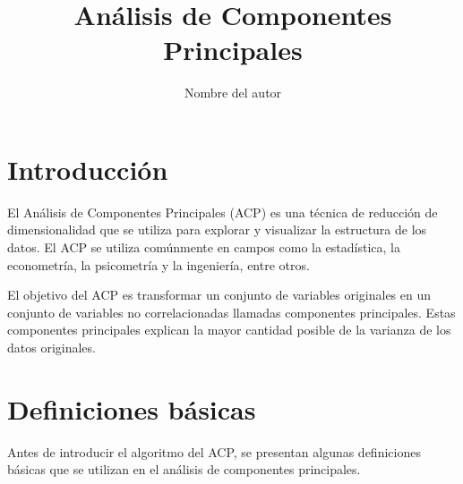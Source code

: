 \documentclass{article}
\begin{document}
\title{Análisis de Componentes Principales}
\author{Nombre del autor}
\maketitle

\section{Introducción}

El Análisis de Componentes Principales (ACP) es una técnica de reducción de dimensionalidad que se utiliza para explorar y visualizar la estructura de los datos. El ACP se utiliza comúnmente en campos como la estadística, la econometría, la psicometría y la ingeniería, entre otros.

El objetivo del ACP es transformar un conjunto de variables originales en un conjunto de variables no correlacionadas llamadas componentes principales. Estas componentes principales explican la mayor cantidad posible de la varianza de los datos originales.

\section{Definiciones básicas}

Antes de introducir el algoritmo del ACP, se presentan algunas definiciones básicas que se utilizan en el análisis de componentes principales.
\end{document}
